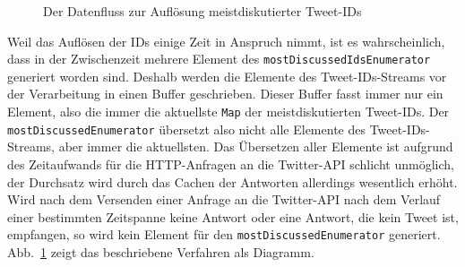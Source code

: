 \begin{figure}
{
}

\vspace{5mm}


\caption{Der Datenfluss zur Auflösung meistdiskutierter Tweet-IDs}
\label{fig:der_datenfluss_zur_aufloesung_meistdikutierter_tweet_ids}
\end{figure}

Weil das Auflösen der IDs einige Zeit in Anspruch nimmt, ist es wahrscheinlich, dass in der Zwischenzeit mehrere Element des \lstinline|mostDiscussedIdsEnumerator| generiert worden sind.
Deshalb werden die Elemente des Tweet-IDs-Streams vor der Verarbeitung in einen Buffer geschrieben.
Dieser Buffer fasst immer nur ein Element, also die immer die aktuellste \lstinline|Map| der meistdiskutierten Tweet-IDs.
Der \lstinline|mostDiscussedEnumerator| übersetzt also nicht alle Elemente des Tweet-IDs-Streams, aber immer die aktuellsten.
Das Übersetzen aller Elemente ist aufgrund des Zeitaufwands für die HTTP-Anfragen an die Twitter-API schlicht unmöglich, der Durchsatz wird durch das Cachen der Antworten allerdings wesentlich erhöht.
Wird nach dem Versenden einer Anfrage an die Twitter-API nach dem Verlauf einer bestimmten Zeitspanne keine Antwort oder eine Antwort, die kein Tweet ist, empfangen, so wird kein Element für den \lstinline|mostDiscussedEnumerator| generiert.
Abb.~\ref{fig:der_datenfluss_zur_aufloesung_meistdikutierter_tweet_ids} zeigt das beschriebene Verfahren als Diagramm.

